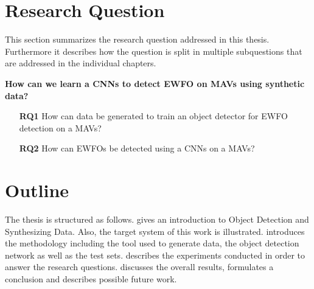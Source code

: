 \section{Research Question}

This section summarizes the research question addressed in this thesis. Furthermore it describes how the question is split in multiple subquestions that are addressed in the individual chapters.

	\textbf{How can we learn a \acp{CNN} to detect \ac{EWFO} on \acp{MAV} using synthetic data?}


\begin{enumerate}
	\item[\textbf{RQ1}]How can data be generated to train an object detector for \ac{EWFO} detection on a \acp{MAV}?
	\item[\textbf{RQ2}]How can \acp{EWFO} be detected using a \acp{CNN} on a \acp{MAV}?
\end{enumerate}

\section{Outline}


The thesis is structured as follows.  gives an introduction to Object Detection and Synthesizing Data. Also, the target system of this work is illustrated.   introduces the methodology including the tool used to generate data, the object detection network as well as the test sets.  describes the experiments conducted in order to answer the research questions.  discusses the overall results, formulates a conclusion and describes possible future work.



